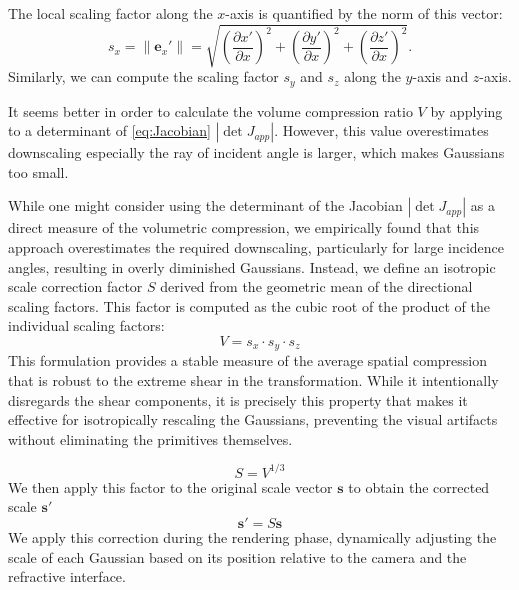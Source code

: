 The local scaling factor along the \(x\)-axis is quantified by the norm of this vector:
\begin{equation}
    s_x = \|\mathbf{e}_{x}'\| = \sqrt{\left(\frac{\partial x'}{\partial x}\right)^2 + \left(\frac{\partial y'}{\partial x}\right)^2 + \left(\frac{\partial z'}{\partial x}\right)^2}.
\end{equation}
Similarly, we can compute the scaling factor $s_y$ and $s_z$ along the $y$-axis and $z$-axis.

It seems better in order to calculate the volume compression ratio $V$ by applying to a determinant of \cref{eq:Jacobian} $|\det J_{app}|$.
However, this value overestimates downscaling especially the ray of incident angle is larger, which makes Gaussians too small.

While one might consider using the determinant of the Jacobian $|\det J_{app}|$ as a direct measure of the volumetric compression, we empirically found that this approach overestimates the required downscaling, particularly for large incidence angles, resulting in overly diminished Gaussians.
Instead, we define an isotropic scale correction factor $S$ derived from the geometric mean of the directional scaling factors. 
This factor is computed as the cubic root of the product of the individual scaling factors:
\begin{equation}
  \label{eq:volume-compression-ratio}
  V = s_x \cdot s_y \cdot s_z
\end{equation}
This formulation provides a stable measure of the average spatial compression that is robust to the extreme shear in the transformation.
While it intentionally disregards the shear components, it is precisely this property that makes it effective for isotropically rescaling the Gaussians, preventing the visual artifacts without eliminating the primitives themselves.


\begin{equation}\label{scale-correction-factor}
  S = V ^ {1/3}
\end{equation}
We then apply this factor to the original scale vector  $\bm{s}$ to obtain the corrected scale $\bm{s'}$
\begin{equation}
\label{eq:scale-correction-edge}  
  \bm{s'} = S \bm{s}
\end{equation}
We apply this correction during the rendering phase, dynamically adjusting the scale of each Gaussian based on its position relative to the camera and the refractive interface.


